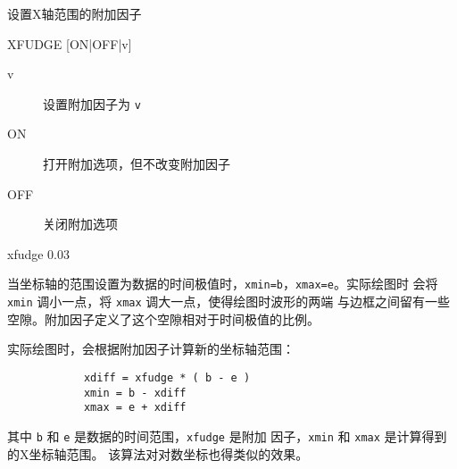 \label{cmd:xfudge}

设置X轴范围的附加因子

\begin{SACSTX}
XFUDGE [ON|OFF|v]
\end{SACSTX}

\begin{description}
\item [v] 设置附加因子为 \texttt{v}
\item [ON] 打开附加选项，但不改变附加因子
\item [OFF] 关闭附加选项
\end{description}

\begin{SACDFT}
xfudge 0.03
\end{SACDFT}

当坐标轴的范围设置为数据的时间极值时，\texttt{xmin=b}，\texttt{xmax=e}。实际绘图时
会将 \texttt{xmin} 调小一点，将 \texttt{xmax} 调大一点，使得绘图时波形的两端
与边框之间留有一些空隙。附加因子定义了这个空隙相对于时间极值的比例。

实际绘图时，会根据附加因子计算新的坐标轴范围：
\begin{verbatim}
            xdiff = xfudge * ( b - e )
            xmin = b - xdiff
            xmax = e + xdiff
\end{verbatim}
其中 \texttt{b} 和 \texttt{e} 是数据的时间范围，\texttt{xfudge} 是附加
因子，\texttt{xmin} 和 \texttt{xmax} 是计算得到的X坐标轴范围。
该算法对对数坐标也得类似的效果。
